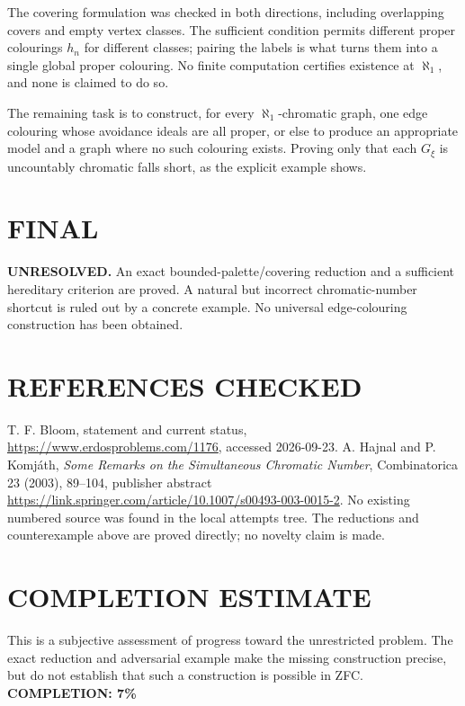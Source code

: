 The covering formulation was checked in both directions, including overlapping covers and empty vertex classes. The sufficient condition permits different proper colourings $h_n$ for different classes; pairing the labels is what turns them into a single global proper colouring. No finite computation certifies existence at $\aleph_1$, and none is claimed to do so.

The remaining task is to construct, for every $\aleph_1$-chromatic graph, one edge colouring whose avoidance ideals are all proper, or else to produce an appropriate model and a graph where no such colouring exists. Proving only that each $G_\xi$ is uncountably chromatic falls short, as the explicit example shows.

\section{FINAL}
\textbf{UNRESOLVED.} An exact bounded-palette/covering reduction and a sufficient hereditary criterion are proved. A natural but incorrect chromatic-number shortcut is ruled out by a concrete example. No universal edge-colouring construction has been obtained.

\section{REFERENCES CHECKED}
T. F. Bloom, statement and current status, \url{https://www.erdosproblems.com/1176}, accessed 2026-09-23. A. Hajnal and P. Komj\'ath, \emph{Some Remarks on the Simultaneous Chromatic Number}, Combinatorica 23 (2003), 89--104, publisher abstract \url{https://link.springer.com/article/10.1007/s00493-003-0015-2}. No existing numbered source was found in the local attempts tree. The reductions and counterexample above are proved directly; no novelty claim is made.

\section{COMPLETION ESTIMATE}
This is a subjective assessment of progress toward the unrestricted problem. The exact reduction and adversarial example make the missing construction precise, but do not establish that such a construction is possible in ZFC.
\textbf{COMPLETION: 7\%}
